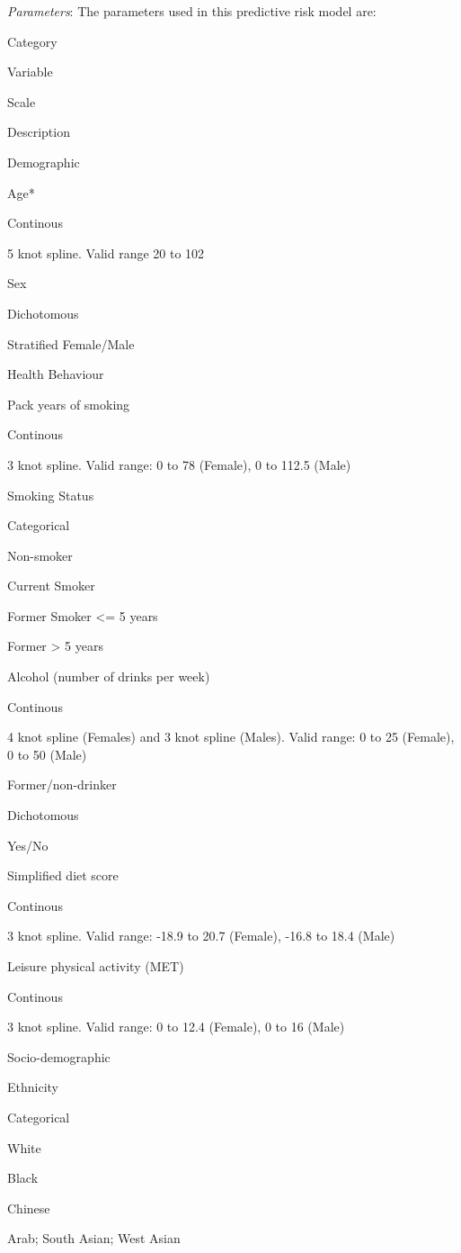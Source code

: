 \documentclass[]{book}
\begin{document}
\emph{Parameters}: The parameters used in this predictive risk model
are:

Category

Variable

Scale

Description

Demographic

Age*

Continous

5 knot spline. Valid range 20 to 102

Sex

Dichotomous

Stratified Female/Male

Health Behaviour

Pack years of smoking

Continous

3 knot spline. Valid range: 0 to 78 (Female), 0 to 112.5 (Male)

Smoking Status

Categorical

Non-smoker

Current Smoker

Former Smoker \textless{}= 5 years

Former \textgreater{} 5 years

Alcohol (number of drinks per week)

Continous

4 knot spline (Females) and 3 knot spline (Males). Valid range: 0 to 25
(Female), 0 to 50 (Male)

Former/non-drinker

Dichotomous

Yes/No

Simplified diet score

Continous

3 knot spline. Valid range: -18.9 to 20.7 (Female), -16.8 to 18.4 (Male)

Leisure physical activity (MET)

Continous

3 knot spline. Valid range: 0 to 12.4 (Female), 0 to 16 (Male)

Socio-demographic

Ethnicity

Categorical

White

Black

Chinese

Arab; South Asian; West Asian
\end{document}
